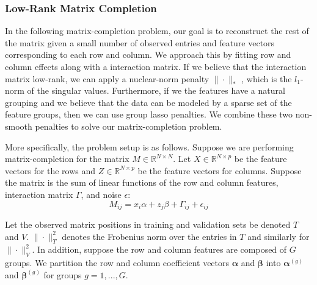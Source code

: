 \documentclass[12pt]{article}
\begin{document}
\subsubsection{Low-Rank Matrix Completion}\label{sec:matrix_completion}

In the following matrix-completion problem, our goal is to reconstruct the rest of the matrix given a small number of observed entries and feature vectors corresponding to each row and column. We approach this by fitting row and column effects along with a interaction matrix. If we believe that the interaction matrix low-rank, we can apply a nuclear-norm penalty $\|\cdot \|_*$ \citep{fazel2002matrix, srebro2004learning}, which is the $l_1$-norm of the singular values. Furthermore, if we the features have a natural grouping and we believe that the data can be modeled by a sparse set of the feature groups, then we can use group lasso penalties. We combine these two non-smooth penalties to solve our matrix-completion problem.

More specifically, the problem setup is as follows. Suppose we are performing matrix-completion for the matrix $M \in \mathbb{R}^{N\times N}$. Let $X\in \mathbb{R}^{N \times p}$ be the feature vectors for the rows and $Z \in \mathbb{R}^{N \times p}$ be the feature vectors for columns.
Suppose the matrix is the sum of linear functions of the row and column features, interaction matrix $\Gamma$, and noise $\epsilon$:
\begin{equation}
M_{ij} = x_i \alpha + z_j \beta + \Gamma_{ij} + \epsilon_{ij}
\end{equation}

Let the observed matrix positions in training and validation sets be denoted $T$ and $V$. $\| \cdot \|^2_T$ denotes the Frobenius norm over the entries in $T$ and similarly for $\| \cdot \|^2_V$. In addition, suppose the row and column features are composed of $G$ groups. We partition the row and column coefficient vectors $\boldsymbol{\alpha}$ and $\boldsymbol{\beta}$ into $\boldsymbol{\alpha}^{(g)}$ and $\boldsymbol{\beta}^{(g)}$ for groups $g=1,...,G$. 
\end{document}
